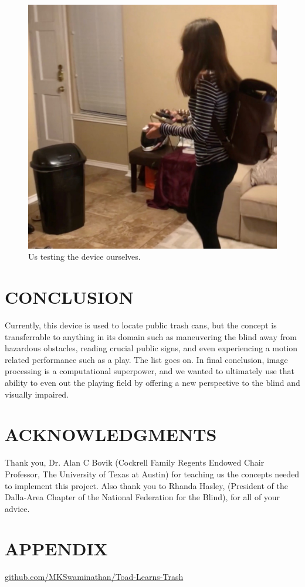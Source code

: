 \documentclass{article}
\begin{document}
\begin{figure}[ht]
    \centering
    \includegraphics[width=.6\columnwidth]{demo.jpg}
    \caption{\label{fig:3} Us testing the device ourselves.}
\end{figure}


\section{CONCLUSION}
\label{sec:conclusion}

Currently, this device is used to locate public trash cans, but the concept is transferrable to anything in its domain such as maneuvering the blind away from hazardous obstacles, reading crucial public signs, and even experiencing a motion related performance such as a play. The list goes on. In final conclusion, image processing is a computational superpower, and we wanted to ultimately use that ability to even out the playing field by offering a new perspective to the blind and visually impaired. 

\section{ACKNOWLEDGMENTS}
\label{sec:ack}

Thank you, Dr. Alan C Bovik (Cockrell Family Regents Endowed Chair Professor, The University of Texas at Austin) for teaching us the concepts needed to implement this project. Also thank you to Rhanda Hasley, (President of the Dalla-Area Chapter of the National Federation for the Blind), for all of your advice.

\section{APPENDIX}
\label{sec:appendix}

\url{github.com/MKSwaminathan/Toad-Learns-Trash}






\end{document}
